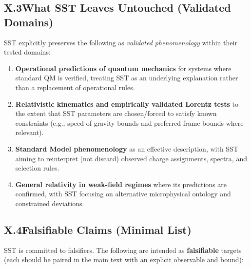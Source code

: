 \documentclass[11pt]{article}
\begin{document}
        \subsection*{X.3\quad What SST Leaves Untouched (Validated Domains)}
            SST explicitly preserves the following as \emph{validated phenomenology} within their tested domains:
            \begin{enumerate}
                \item \textbf{Operational predictions of quantum mechanics} for systems where standard QM is verified, treating SST as an underlying explanation rather than a replacement of operational rules.

                \item \textbf{Relativistic kinematics and empirically validated Lorentz tests} to the extent that SST parameters are chosen/forced to satisfy known constraints (e.g., speed-of-gravity bounds and preferred-frame bounds where relevant).

                \item \textbf{Standard Model phenomenology} as an effective description, with SST aiming to reinterpret (not discard) observed charge assignments, spectra, and selection rules.

                \item \textbf{General relativity in weak-field regimes} where its predictions are confirmed, with SST focusing on alternative microphysical ontology and constrained deviations.
            \end{enumerate}

        \subsection*{X.4\quad Falsifiable Claims (Minimal List)}
            SST is committed to falsifiers. The following are intended as \textbf{falsifiable} targets (each should be paired in the main text with an explicit observable and bound):
\end{document}
